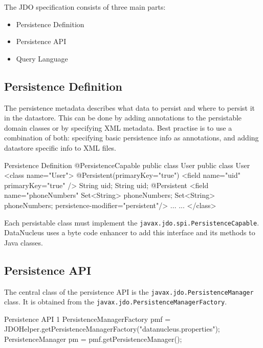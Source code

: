 \documentclass[a4paper,11pt,oneside]{article}
\begin{document}
The JDO specification \cite{JDO Spec} consists of three main parts:
\begin{itemize}
\item Persistence Definition
\item Persistence API
\item Query Language
\end{itemize}

\subsection{Persistence Definition}
The persistence metadata describes what data to persist and where to persist it in the datastore. This can be done by adding annotations to the persistable domain classes or by specifying XML metadata. Best practise is to use a combination of both: specifying basic persistence info as annotations, and adding datastore specific info to XML files.

\begin{SaveVerbatim}{Persistence Definition}
                            @PersistenceCapable
public class User           public class User                <class name="User">                   
{                           {                                          
                              @Persistent(primaryKey="true")   <field name="uid" primaryKey="true" />   
  String uid;                 String uid;                              
                              @Persistent                      <field name="phoneNumbers" 
  Set<String> phoneNumbers;   Set<String> phoneNumbers;          persistence-modifier="persistent"/>
    ...                         ...
}                           }                                </class>
\end{SaveVerbatim}
\begin{figure}[htb]
\end{figure}

Each persistable class must implement the \texttt{javax.jdo.spi.PersistenceCapable}. DataNucleus uses a byte code enhancer to add this interface and its methods to Java classes.

\subsection{Persistence API}
The central class of the persistence API is the \texttt{javax.jdo.PersistenceManager} class. It is obtained from the \texttt{javax.jdo.PersistenceManagerFactory}.
\begin{SaveVerbatim}{Persistence API 1}
PersistenceManagerFactory pmf =
    JDOHelper.getPersistenceManagerFactory("datanucleus.properties");
PersistenceManager pm = pmf.getPersistenceManager();
\end{SaveVerbatim}
\begin{figure}[htb]
\end{figure}
\end{document}
